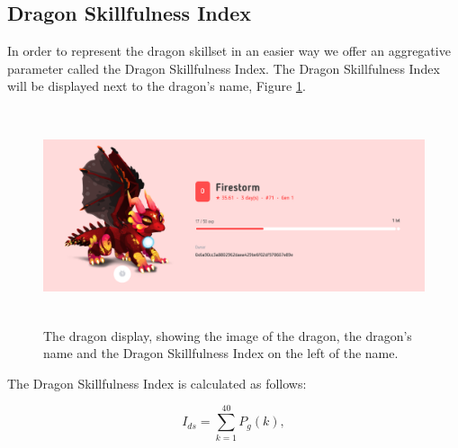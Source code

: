 \documentclass[12pt]{article}
\begin{document}
{\subsection{Dragon Skillfulness Index}
\label{Dragon Skillfulness Index}  \par

In order to represent the dragon skillset in an easier way we offer an aggregative parameter called the Dragon Skillfulness Index. The Dragon Skillfulness Index will be displayed next to the dragon’s name, Figure \ref{fig:The_dragon_display_showing_the_image_of_the_dragon_the_dragons_name_and_the_Dragon_Skillfulness_Index_on_the_left_of_the_name}.\par




\begin{figure}[!ht]
	\begin{FlushLeft}		\includegraphics[width=6.27in,height=2.49in]{./media/image21.png}
		\caption{The dragon display, showing the image of the dragon, the dragon's name and the Dragon Skillfulness Index on the left of the name.}
		\label{fig:The_dragon_display_showing_the_image_of_the_dragon_the_dragons_name_and_the_Dragon_Skillfulness_Index_on_the_left_of_the_name}
	\end{FlushLeft}\end{figure}




\par

The Dragon Skillfulness Index is calculated as follows:\par

\setlength{\parskip}{0.0pt}
\begin{center}
  \begin{equation}
      I_{ds}=\sum_{k=1}^{40} P_g(k),
  \end{equation}
\end{center} \par

}
\end{document}
